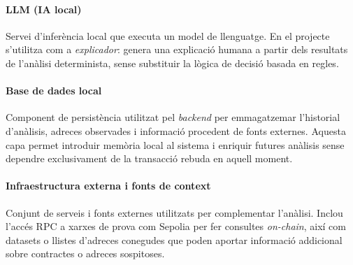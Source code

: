 \paragraph{LLM (IA local)}
Servei d’inferència local que executa un model de llenguatge. En el projecte s’utilitza com a \emph{explicador}: genera una explicació humana a partir dels resultats de l’anàlisi determinista, sense substituir la lògica de decisió basada en regles.

\paragraph{Base de dades local} Component de persistència utilitzat pel \textit{backend} per emmagatzemar l’historial d’anàlisis, adreces observades i informació procedent de fonts externes. Aquesta capa permet introduir memòria local al sistema i enriquir futures anàlisis sense dependre exclusivament de la transacció rebuda en aquell moment.


\paragraph{Infraestructura externa i fonts de context} Conjunt de serveis i fonts externes utilitzats per complementar l’anàlisi. Inclou l’accés RPC a xarxes de prova com Sepolia per fer consultes \textit{on-chain}, així com datasets o llistes d’adreces conegudes que poden aportar informació addicional sobre contractes o adreces sospitoses.